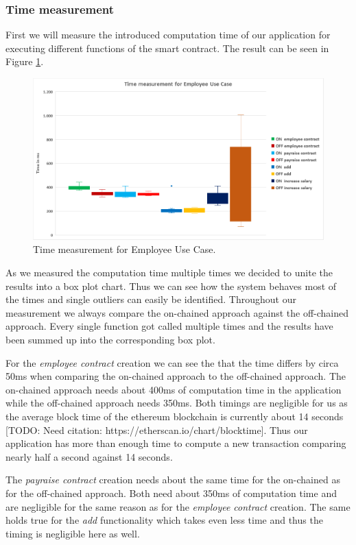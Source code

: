 \subsubsection{Time measurement}
First we will measure the introduced computation time of our application for executing different functions of the smart contract. The result can be seen in Figure \ref{fig:05_time}.

\begin{figure}[t]%
\centering
\includegraphics[width=1.0\textwidth]{images/05_time.png}
\caption{\label{fig:05_time}Time measurement for Employee Use Case.}
\end{figure}

As we measured the computation time multiple times we decided to unite the results into a box plot chart. Thus we can see how the system behaves most of the times and single outliers can easily be identified. Throughout our measurement we always compare the on-chained approach against the off-chained approach. Every single function got called multiple times and the results have been summed up into the corresponding box plot.

For the \textit{employee contract} creation we can see the that the time differs by circa 50ms when comparing the on-chained approach to the off-chained approach. The on-chained approach needs about 400ms of computation time in the application while the off-chained approach needs 350ms. Both timings are negligible for us as the average block time of the ethereum blockchain is currently about 14 seconds [TODO: Need citation: https://etherscan.io/chart/blocktime]. Thus our application has more than enough time to compute a new transaction comparing nearly half a second against 14 seconds.

The \textit{payraise contract} creation needs about the same time for the on-chained as for the off-chained approach. Both need about 350ms of computation time and are negligible for the same reason as for the \textit{employee contract} creation. The same holds true for the \textit{add} functionality which takes even less time and thus the timing is negligible here as well.

